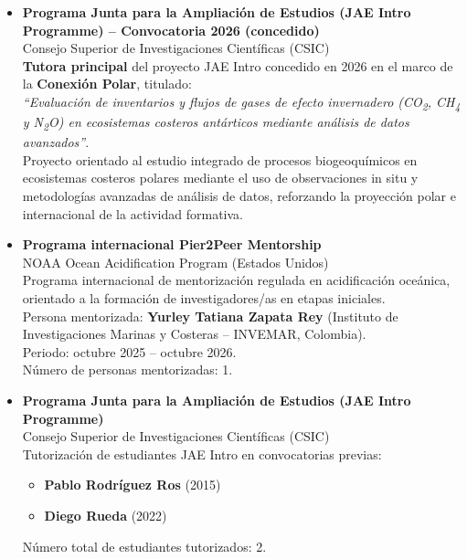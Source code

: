 \documentclass[11pt,a4paper]{article}
\begin{document}
\begin{itemize}[leftmargin=*]

    \item \textbf{Programa Junta para la Ampliación de Estudios (JAE Intro Programme) – Convocatoria 2026 (concedido)}\\
    Consejo Superior de Investigaciones Científicas (CSIC)\\
    \textbf{Tutora principal} del proyecto JAE Intro concedido en 2026 en el marco de la \textbf{Conexión Polar}, titulado:\\
    \emph{“Evaluación de inventarios y flujos de gases de efecto invernadero (CO\textsubscript{2}, CH\textsubscript{4} y N\textsubscript{2}O) en ecosistemas costeros antárticos mediante análisis de datos avanzados”}.\\
    Proyecto orientado al estudio integrado de procesos biogeoquímicos en ecosistemas costeros polares mediante el uso de observaciones in situ y metodologías avanzadas de análisis de datos, reforzando la proyección polar e internacional de la actividad formativa.

    \item \textbf{Programa internacional Pier2Peer Mentorship}\\
    NOAA Ocean Acidification Program (Estados Unidos)\\
    Programa internacional de mentorización regulada en acidificación oceánica, orientado a la formación de investigadores/as en etapas iniciales.\\
    Persona mentorizada: \textbf{Yurley Tatiana Zapata Rey} (Instituto de Investigaciones Marinas y Costeras -- INVEMAR, Colombia).\\
    Periodo: octubre 2025 – octubre 2026.\\
    Número de personas mentorizadas: 1.

    \item \textbf{Programa Junta para la Ampliación de Estudios (JAE Intro Programme)}\\
    Consejo Superior de Investigaciones Científicas (CSIC)\\
    Tutorización de estudiantes JAE Intro en convocatorias previas:
    \begin{itemize}
        \item \textbf{Pablo Rodríguez Ros} (2015)
        \item \textbf{Diego Rueda} (2022)
    \end{itemize}
    Número total de estudiantes tutorizados: 2.

\end{itemize}
\newpage
\end{document}
